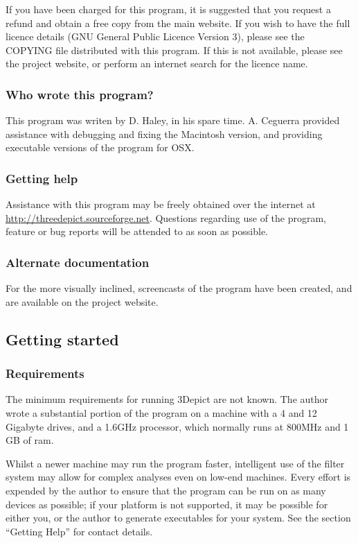 \documentclass[10pt]{article}
\begin{document}
If you have been charged for this program, it is suggested that you request a refund and obtain a free copy from the main website. If you wish to have the full licence details (GNU General Public Licence Version 3), please see the COPYING file distributed with this program. If this is not available, please see the project website, or perform an internet search for the licence name. 
\subsubsection{Who wrote this program?}


This program was writen by D. Haley, in his spare time. A. Ceguerra provided assistance with debugging and fixing the Macintosh version, and providing executable versions of the program for OSX. 
\subsubsection{Getting help}


Assistance with this program may be freely obtained over the internet at \url{http://threedepict.sourceforge.net}. Questions regarding use of the program, feature or bug reports will be attended to as soon as possible. 
\subsubsection{Alternate documentation}
For the more visually inclined, screencasts of the program have been created, and are available on the project website. 

\subsection{ Getting started }
\subsubsection{ Requirements}


The minimum requirements for running 3Depict are not known. The author wrote a substantial portion of the program on a machine with a 4 and 12 Gigabyte drives, and a 1.6GHz processor, which normally runs at 800MHz and 1 GB of ram.  

Whilst a newer machine may run the program faster, intelligent use of the filter system may allow for complex analyses even on low-end machines. Every effort is expended by the author to ensure that the program can be run on as many devices as possible; if your platform is not supported, it may be possible for either you, or the author to generate executables for your system. See the section ``Getting Help'' for contact details.  
\end{document}
